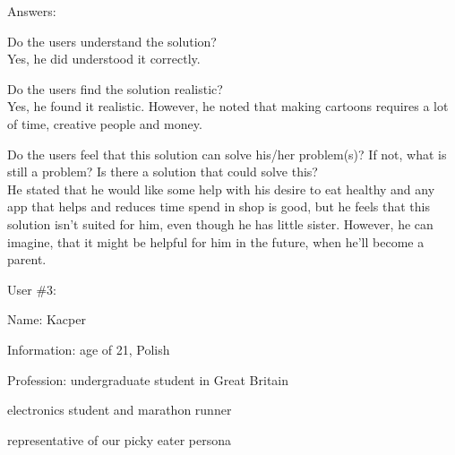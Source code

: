 \documentclass[a4paper,10pt,oneside]{scrreprt}
\begin{document}
Answers:
\begin{compactitem}
	\item Do the users understand the solution?\\
		Yes, he did understood it correctly.\\
	
	\item Do the users find the solution realistic?\\
		Yes, he found it realistic. However, he noted that making cartoons requires a lot of time, creative people and money.\\
		
	\item Do the users feel that this solution can solve his/her problem(s)? If not, what is still
	a problem? Is there a solution that could solve this?\\
		He stated that he would like some help with his desire to eat healthy and any app that helps and reduces time spend in shop is good, but he feels that this solution
isn't suited for him, even though he has little sister. However, he can imagine, that it might be helpful for him in the future, when he'll become a parent.

\end{compactitem}
\bigskip
\bigskip
User \#3:
\begin{compactitem}
	\item Name: Kacper
	\item Information: age of 21, Polish
	\item Profession: undergraduate student in Great Britain
	\item electronics student and marathon runner
	\item representative of our picky eater persona
\end{compactitem}
\bigskip
\end{document}
